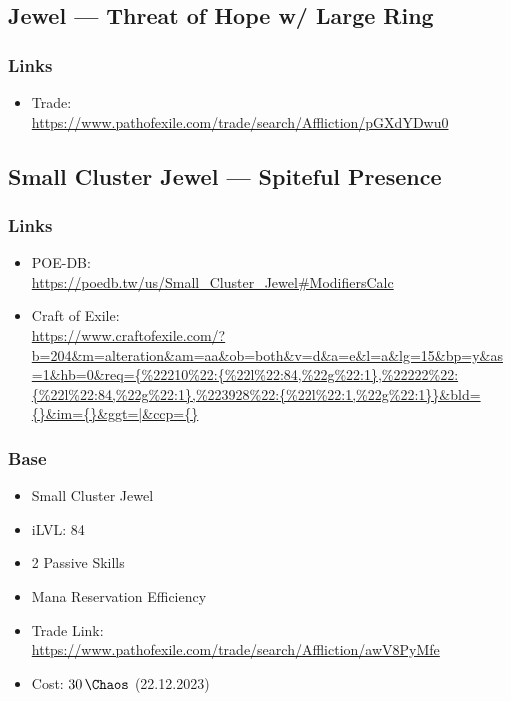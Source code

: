 \subsection{Jewel --- Threat of Hope w/ Large Ring}
\subsubsection{Links}
\begin{itemize}
	\item Trade:\\\url{https://www.pathofexile.com/trade/search/Affliction/pGXdYDwu0}
\end{itemize}

\subsection{Small Cluster Jewel --- Spiteful Presence}
\subsubsection{Links}
\begin{itemize}
	\item POE-DB:\\
	\url{https://poedb.tw/us/Small_Cluster_Jewel#ModifiersCalc}
	
	\item Craft of Exile:\\
	\url{https://www.craftofexile.com/?b=204&m=alteration&am=aa&ob=both&v=d&a=e&l=a&lg=15&bp=y&as=1&hb=0&req={%
\end{itemize}

\subsubsection{Base}
\begin{itemize}
	\item Small Cluster Jewel
	\item iLVL: 84
	\item 2 Passive Skills
	\item Mana Reservation Efficiency
	\item Trade Link: \url{https://www.pathofexile.com/trade/search/Affliction/awV8PyMfe}
	\item Cost: $\SI{30}{\Chaos}$ (22.12.2023)
\end{itemize}

